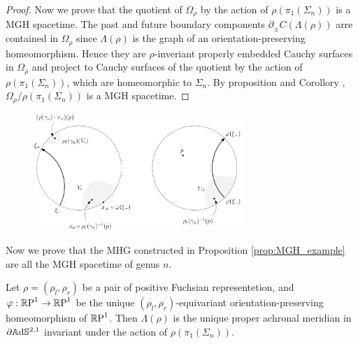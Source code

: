 \begin{proof}
    Now we prove that the quotient of $\Omega_\rho$ by the action of $\rho(\pi_1(\Sigma_n))$ is a MGH spacetime. The past and future boundary components $\partial_\pm C(\Lambda(\rho))$ arre contained in $\Omega_\rho$ since $\Lambda(\rho)$ is the graph of an orientation-preserving homeomorphism. Hence they are $\rho$-inveriant properly embedded Cauchy surfaces in $\Omega_\rho$ and project to Cauchy surfaces of the quotient by the action of $\rho(\pi_1(\Sigma_n))$, which are homeomorphic to $\Sigma_n$. By proposition  and Corollory , $\Omega_\rho / \rho(\pi_1(\Sigma_n))$ is a MGH spacetime.
\end{proof}
\begin{figure}
    \centering
    \includegraphics[width=0.7\textwidth]{dynamics.png}
    \caption{}
\end{figure}
Now we prove that the MHG constructed in Proposition \ref{prop:MGH_example} are all the MGH spacetime of genus $n$.
\begin{lemma}
    Let $\rho=(\rho_l,\rho_r)$ be a pair of positive Fuchsian representetion, and $\varphi :\S \to \S$ be the unique $(\rho_l,\rho_r)$-equivariant orientation-preserving homeomorphism of $\S$. Then $\Lambda(\rho)$ is the unique proper achronal meridian in $\partial \A^{2,1}$ invariant under the action of $\rho(\pi_1(\Sigma_n))$.
\end{lemma}
